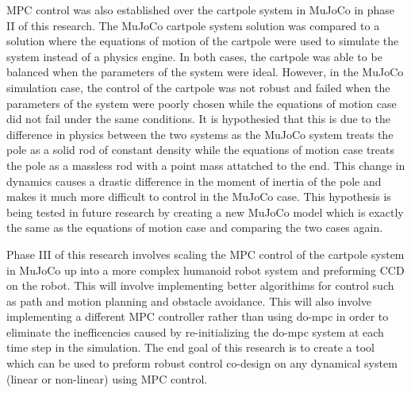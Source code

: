 \documentclass{./springer/svjour3}
\begin{document}
MPC control was also established over the cartpole system in MuJoCo in phase II of this research. The MuJoCo cartpole system solution was compared to a solution
where the equations of motion of the cartpole were used to simulate the system instead of a physics engine. In both cases, the cartpole was able to be balanced when the 
parameters of the system were ideal. However, in the MuJoCo simulation case, the control of the cartpole was not robust and failed when the parameters of the system were
poorly chosen while the equations of motion case did not fail under the same conditions. It is hypothesied that this is due to the difference in physics 
between the two systems as the MuJoCo system treats the pole as a solid rod of constant density while the equations of motion case treats the pole as a massless rod with a point mass 
attatched to the end. This change in dynamics causes a drastic difference in the moment of inertia of the pole and makes it much more difficult to control in the 
MuJoCo case. This hypothesis is being tested in future research by creating a new MuJoCo model which is exactly the same as the equations of motion case 
and comparing the two cases again.

Phase III of this research involves scaling the MPC control of the cartpole system in MuJoCo up into a more complex humanoid robot system and preforming CCD on the robot. 
This will involve implementing better algorithims for control such as path and motion planning and obstacle avoidance. This will also involve implementing a different 
MPC controller rather than using do-mpc in order to eliminate the inefficencies caused by re-initializing the do-mpc system at each time step in the simulation. The end 
goal of this research is to create a tool which can be used to preform robust control co-design on any dynamical system (linear or non-linear) using MPC control.

\pagestyle{plain}
\normalsize

\end{document}
